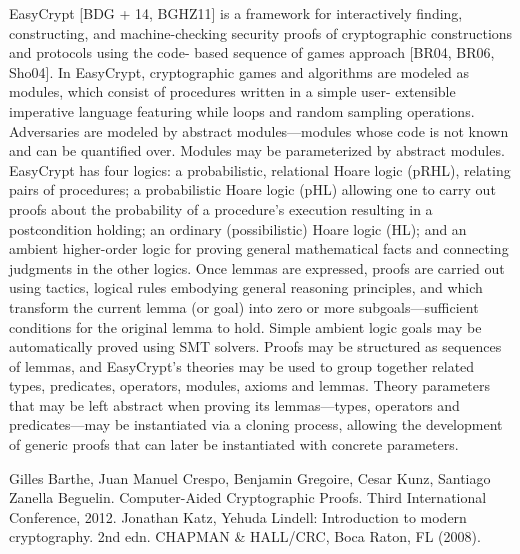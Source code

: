 \documentclass[runningheads]{llncs}
\begin{document}
EasyCrypt [BDG + 14, BGHZ11] is a framework for interactively finding, constructing, and
machine-checking security proofs of cryptographic constructions and protocols using the code-
based sequence of games approach [BR04, BR06, Sho04]. In EasyCrypt, cryptographic games
and algorithms are modeled as modules, which consist of procedures written in a simple user-
extensible imperative language featuring while loops and random sampling operations. Adversaries
are modeled by abstract modules—modules whose code is not known and can be quantified over.
Modules may be parameterized by abstract modules.
EasyCrypt has four logics: a probabilistic, relational Hoare logic (pRHL), relating pairs of
procedures; a probabilistic Hoare logic (pHL) allowing one to carry out proofs about the probability
of a procedure’s execution resulting in a postcondition holding; an ordinary (possibilistic) Hoare
logic (HL); and an ambient higher-order logic for proving general mathematical facts and
connecting judgments in the other logics. Once lemmas are expressed, proofs are carried out
using tactics, logical rules embodying general reasoning principles, and which transform the
current lemma (or goal) into zero or more subgoals—sufficient conditions for the original lemma
to hold. Simple ambient logic goals may be automatically proved using SMT solvers. Proofs may
be structured as sequences of lemmas, and EasyCrypt’s theories may be used to group together
related types, predicates, operators, modules, axioms and lemmas. Theory parameters that may
be left abstract when proving its lemmas—types, operators and predicates—may be instantiated
via a cloning process, allowing the development of generic proofs that can later be instantiated
with concrete parameters.
%
%
%
% 
% 
%
\begin{thebibliography}{8}
Gilles Barthe, Juan Manuel Crespo, Benjamin Gregoire, Cesar Kunz, Santiago Zanella Beguelin. Computer-Aided Cryptographic Proofs. Third International Conference, 2012.
Jonathan Katz, Yehuda Lindell: Introduction to modern cryptography. 2nd edn. CHAPMAN \& HALL/CRC, Boca Raton, FL (2008).
\end{thebibliography}
\end{document}
